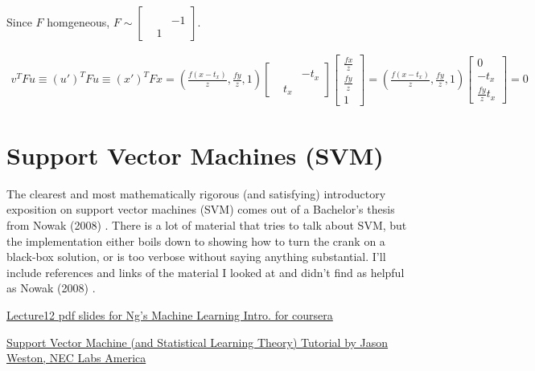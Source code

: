 \documentclass[10pt]{amsart}
\begin{document}
\begin{multicols*}{2}
Since $F$ homgeneous, $F\sim \left[ \begin{matrix} & & \\ & & -1 \\ & 1 & \end{matrix} \right]$.  

\[
\begin{gathered}
v^T F u \equiv (u')^T Fu \equiv (x')^T Fx = \left( \frac{ f(x-t_x)}{z}, \frac{fy}{z} ,1 \right) \left[ \begin{matrix} & & \\ & & -t_x \\ & t_x & \end{matrix} \right] \left[ \begin{matrix} \frac{fx}{z} \\ \frac{fy}{z} \\ 1 \end{matrix} \right] = \left( \frac{ f(x-t_x)}{z} , \frac{fy}{z} ,1\right) \left[ \begin{matrix} 0 \\ -t_x \\ \frac{fy}{z} t_x \end{matrix} \right] = 0 
\end{gathered}
\]




\part{Support Vector Machines (SVM)}

The clearest and most mathematically rigorous (and satisfying) introductory exposition on support vector machines (SVM) comes out of a Bachelor's thesis from Nowak (2008) \cite{Nowa2008}.  There is a lot of material that tries to talk about SVM, but the implementation either boils down to showing how to turn the crank on a black-box solution, or is too verbose without saying anything substantial.  I'll include references and links of the material I looked at and didn't find as helpful as Nowak (2008) \cite{Nowa2008}.  

\href{https://d18ky98rnyall9.cloudfront.net/_246c2a4e4c249f94c895f607ea1e6407_Lecture12.pdf?Expires=1490227200&Signature=VxrCShNSKNcYN9~2eHC~IQoQv11wIyqVGEMWVtaycFoimayg-XnGkJaBR4s~aIGf3nq~ck-W5ow4WM0-3vLuxfSkmhQflZH4Bx5fVo2w3R~bldnsJc91Bq-w27KZTw-Xanct~Cn7RnT0ViPlGYeUBmmrSoXAer5IZyPVdmbChzY_&Key-Pair-Id=APKAJLTNE6QMUY6HBC5A}{Lecture12 pdf slides for Ng's Machine Learning Intro. for coursera}

\href{http://www.cs.columbia.edu/~kathy/cs4701/documents/jason_svm_tutorial.pdf}{Support Vector Machine
(and Statistical Learning Theory) Tutorial by Jason Weston, NEC Labs America}


\end{multicols*}
\end{document}
